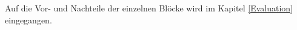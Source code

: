     Auf die Vor- und Nachteile der einzelnen Blöcke wird im Kapitel \ref{Evaluation} eingegangen.
    \newpage
